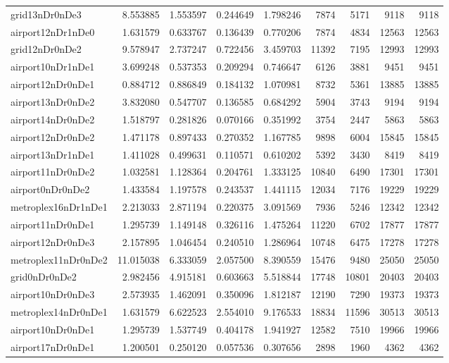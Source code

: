 \begin{longtable}{|l|r|r|r|r|r|r|r|r|}
grid13nDr0nDe3 & 8.553885 & 1.553597 & 0.244649 & 1.798246 & 7874 & 5171 & 9118 & 9118 \\
airport12nDr1nDe0 & 1.631579 & 0.633767 & 0.136439 & 0.770206 & 7874 & 4834 & 12563 & 12563 \\
grid12nDr0nDe2 & 9.578947 & 2.737247 & 0.722456 & 3.459703 & 11392 & 7195 & 12993 & 12993 \\
airport10nDr1nDe1 & 3.699248 & 0.537353 & 0.209294 & 0.746647 & 6126 & 3881 & 9451 & 9451 \\
airport12nDr0nDe1 & 0.884712 & 0.886849 & 0.184132 & 1.070981 & 8732 & 5361 & 13885 & 13885 \\
airport13nDr0nDe2 & 3.832080 & 0.547707 & 0.136585 & 0.684292 & 5904 & 3743 & 9194 & 9194 \\
airport14nDr0nDe2 & 1.518797 & 0.281826 & 0.070166 & 0.351992 & 3754 & 2447 & 5863 & 5863 \\
airport12nDr0nDe2 & 1.471178 & 0.897433 & 0.270352 & 1.167785 & 9898 & 6004 & 15845 & 15845 \\
airport13nDr1nDe1 & 1.411028 & 0.499631 & 0.110571 & 0.610202 & 5392 & 3430 & 8419 & 8419 \\
airport11nDr0nDe2 & 1.032581 & 1.128364 & 0.204761 & 1.333125 & 10840 & 6490 & 17301 & 17301 \\
airport0nDr0nDe2 & 1.433584 & 1.197578 & 0.243537 & 1.441115 & 12034 & 7176 & 19229 & 19229 \\
metroplex16nDr1nDe1 & 2.213033 & 2.871194 & 0.220375 & 3.091569 & 7936 & 5246 & 12342 & 12342 \\
airport11nDr0nDe1 & 1.295739 & 1.149148 & 0.326116 & 1.475264 & 11220 & 6702 & 17877 & 17877 \\
airport12nDr0nDe3 & 2.157895 & 1.046454 & 0.240510 & 1.286964 & 10748 & 6475 & 17278 & 17278 \\
metroplex11nDr0nDe2 & 11.015038 & 6.333059 & 2.057500 & 8.390559 & 15476 & 9480 & 25050 & 25050 \\
grid0nDr0nDe2 & 2.982456 & 4.915181 & 0.603663 & 5.518844 & 17748 & 10801 & 20403 & 20403 \\
airport10nDr0nDe3 & 2.573935 & 1.462091 & 0.350096 & 1.812187 & 12190 & 7290 & 19373 & 19373 \\
metroplex14nDr0nDe1 & 1.631579 & 6.622523 & 2.554010 & 9.176533 & 18834 & 11596 & 30513 & 30513 \\
airport10nDr0nDe1 & 1.295739 & 1.537749 & 0.404178 & 1.941927 & 12582 & 7510 & 19966 & 19966 \\
airport17nDr0nDe1 & 1.200501 & 0.250120 & 0.057536 & 0.307656 & 2898 & 1960 & 4362 & 4362 \\

\end{longtable}
